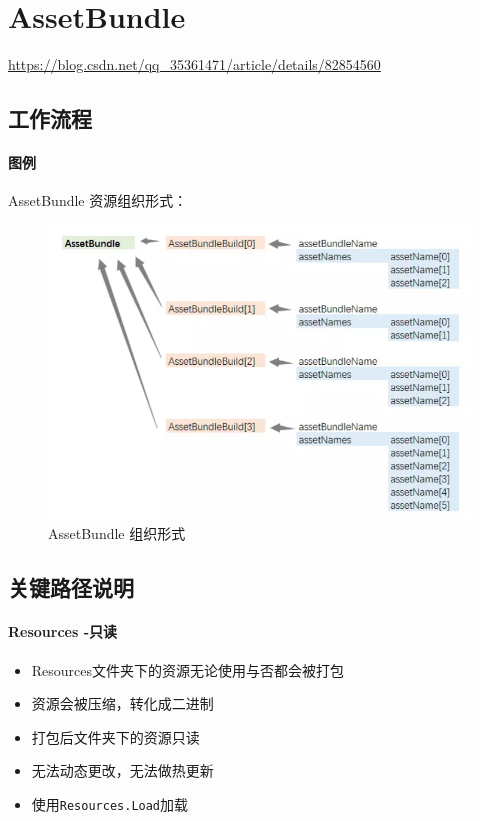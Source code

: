 \documentclass[UTF8,a4paper,12pt]{ctexbook}
\begin{document}
	\section{AssetBundle}	
		\url{https://blog.csdn.net/qq_35361471/article/details/82854560}
	
		\subsection{工作流程}
			
			\paragraph{图例}AssetBundle 资源组织形式：
				\begin{figure}[H]
					\centering
					\includegraphics[scale=0.7]{AssetBundle}
					\caption{AssetBundle 组织形式}
				\end{figure}
		
		\subsection{关键路径说明}
			\paragraph{Resources -只读}
				\begin{itemize}
					\item Resources文件夹下的资源无论使用与否都会被打包
					\item 资源会被压缩，转化成二进制
					\item 打包后文件夹下的资源只读
					\item 无法动态更改，无法做热更新
					\item 使用\verb|Resources.Load|加载
				\end{itemize}
				
\end{document}
